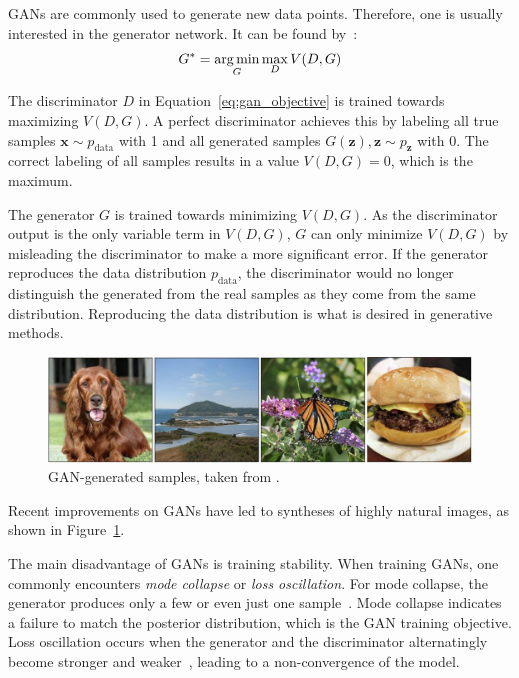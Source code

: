 \acp{GAN} are commonly used to generate new data points.
Therefore, one is usually interested in the generator network.
It can be found by~\citep{goodfellow2014gans}:
\begin{align}
    G^* = \operatorname*{arg\,min}_G \max_{D} V(D, G) \label{eq:gan_objective}
\end{align}

The discriminator $D$ in Equation~\ref{eq:gan_objective} is trained towards maximizing $V(D, G)$.
A perfect discriminator achieves this by labeling all true samples $\bm{x} \sim p_{\text{data}}$ with 1 and all generated samples $G(\bm{z}), \bm{z}\sim p_{\bm{z}}$ with 0.
The correct labeling of all samples results in a value $V(D, G) = 0$, which is the maximum.

The generator $G$ is trained towards minimizing $V(D, G)$.
As the discriminator output is the only variable term in $V(D, G)$, $G$ can only minimize $V(D, G)$ by misleading the discriminator to make a more significant error.
If the generator reproduces the data distribution $p_{\text{data}}$, the discriminator would no longer distinguish the generated from the real samples as they come from the same distribution.
Reproducing the data distribution is what is desired in generative methods.

\begin{figure}
    \centering
    \includegraphics[width=\textwidth]{images/gan_samples.png}
    \caption[\ac{GAN}-generated samples]{\ac{GAN}-generated samples, taken from \citet{brock2018large}.}
    \label{fig:gan_samples}
\end{figure}

Recent improvements on \acp{GAN} have led to syntheses of highly natural images, as shown in Figure~\ref{fig:gan_samples}.

The main disadvantage of \acp{GAN} is training stability.
When training \acp{GAN}, one commonly encounters \textit{mode collapse} or \textit{loss oscillation}.
For mode collapse, the generator produces only a few or even just one sample~\citep{che2016mode}.
Mode collapse indicates a failure to match the posterior distribution, which is the \ac{GAN} training objective.
Loss oscillation occurs when the generator and the discriminator alternatingly become stronger and weaker~\citep{ham2020unbalanced}, leading to a non-convergence of the model.


